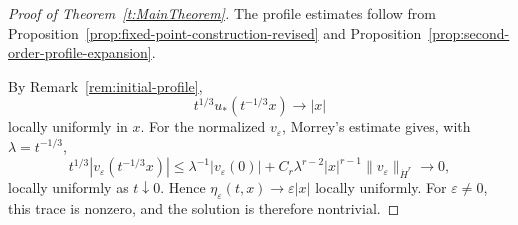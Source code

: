 \documentclass[12pt]{amsart}
\theoremstyle{remark}
\theoremstyle{definition}
\numberwithin{equation}{section}
\begin{document}
\begin{proof}[Proof of Theorem~\ref{t:MainTheorem}]
The profile estimates follow from
Proposition~\ref{prop:fixed-point-construction-revised} and
Proposition~\ref{prop:second-order-profile-expansion}.

By Remark~\ref{rem:initial-profile},
\[
 t^{1/3}u_*(t^{-1/3}x) \longrightarrow |x|
\]
locally uniformly in \(x\).
For the normalized \(v_\varepsilon\), Morrey's estimate gives, with
\(\lambda=t^{-1/3}\),
\[
 t^{1/3}|v_\varepsilon(t^{-1/3}x)|
 \leq\lambda^{-1}|v_\varepsilon(0)|
 +C_r\lambda^{r-2}|x|^{r-1}\|v_\varepsilon\|_{\dot H^r}
 \longrightarrow0,
\]
locally uniformly as \(t\downarrow0\).
Hence \(\eta_\varepsilon(t,x)\to\varepsilon|x|\) locally uniformly.
For \(\varepsilon\neq0\), this trace is nonzero, and the solution is therefore nontrivial.
\end{proof}



\end{document}
